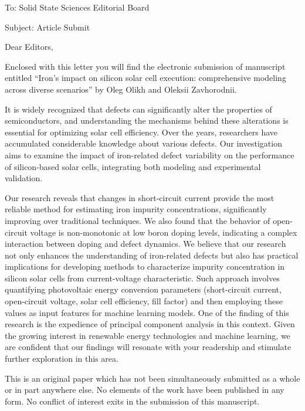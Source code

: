 \documentclass[preprint]{elsarticle}
\begin{document}
To:
Solid State Sciences Editorial Board


Subject:
Article Submit

\vspace{5mm}
Dear Editors,

\vspace{3mm}
Enclosed with this letter you will find the electronic submission of manuscript entitled
``Iron's impact on silicon solar cell execution: comprehensive modeling across diverse scenarios''
by Oleg Olikh and Oleksii Zavhorodnii.

It is widely recognized that defects can significantly alter the properties of semiconductors,
and understanding the mechanisms behind these alterations is essential for optimizing solar cell efficiency.
Over the years, researchers have accumulated considerable knowledge about various defects.
Our investigation aims to examine the impact of iron-related defect variability
on the performance of silicon-based solar cells, integrating both modeling and experimental validation.

Our research reveals that changes in short-circuit current provide the most reliable method for estimating iron impurity concentrations,
significantly improving over traditional techniques.
We also found that the behavior of open-circuit voltage is non-monotonic at low boron doping levels,
indicating a complex interaction between doping and defect dynamics.
We believe that our research not only enhances the understanding of iron-related defects
but also has practical implications for developing methods to characterize impurity concentration in
silicon solar cells from current-voltage characteristic.
Such approach involves quantifying photovoltaic energy conversion parameters
(short-circuit current, open-circuit voltage, solar cell efficiency, fill factor)
and then employing these values as input features for machine learning models.
One of the finding of this research is the expedience of principal component analysis in this context.
Given the growing interest in renewable energy technologies and machine learning,
we are confident that our findings will resonate with your readership and stimulate further exploration in this area.


This is an original paper which has not been simultaneously submitted as a whole or in part anywhere else.
No elements of the work have been published in any form.
No conflict of interest exits in the submission of this manuscript.
\end{document}
